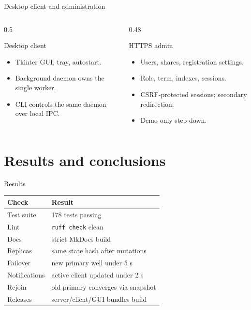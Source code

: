 \documentclass[aspectratio=169]{beamer}
\begin{document}
\begin{frame}{Desktop client and administration}
  \begin{columns}[T]
    \begin{column}{0.5\textwidth}
      \begin{block}{Desktop client}
        \begin{itemize}
          \item Tkinter GUI, tray, autostart.
          \item Background daemon owns the single worker.
          \item CLI controls the same daemon over local IPC.
        \end{itemize}
      \end{block}
    \end{column}
    \begin{column}{0.48\textwidth}
      \begin{block}{HTTPS admin}
        \begin{itemize}
          \item Users, shares, registration settings.
          \item Role, term, indexes, sessions.
          \item CSRF-protected sessions; secondary redirection.
          \item Demo-only step-down.
        \end{itemize}
      \end{block}
    \end{column}
  \end{columns}
\end{frame}

\section{Results and conclusions}

\begin{frame}{Results}
  \begin{table}
    \centering
    \begin{tabular}{ll}
      \toprule
      Check & Result \\
      \midrule
      Test suite & 178 tests passing \\
      Lint & \texttt{ruff check} clean \\
      Docs & strict MkDocs build \\
      Replicas & same state hash after mutations \\
      Failover & new primary well under 5 s \\
      Notifications & active client updated under 2 s \\
      Rejoin & old primary converges via snapshot \\
      Releases & server/client/GUI bundles build \\
      \bottomrule
    \end{tabular}
  \end{table}
\end{frame}
\end{document}
